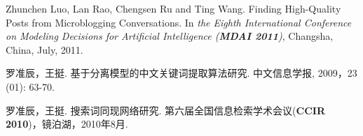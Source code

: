 \begin{resume}
\begin{enumerate}[{[}1{]}]
\item Zhunchen Luo, Lan Rao, Chengsen Ru and Ting Wang. Finding High-Quality Posts from Microblogging Conversations. In {\it the Eighth International Conference on Modeling Decisions for Artificial Intelligence (\textbf{MDAI 2011})}, Changsha, China, July, 2011.

\item 罗准辰，王挺. 基于分离模型的中文关键词提取算法研究. 中文信息学报, 2009，23 (01): 63-70.

\item 罗准辰，王挺. 搜索词同现网络研究. 第六届全国信息检索学术会议(\textbf{CCIR 2010})，镜泊湖，2010年8月.

  \end{enumerate}

\end{resume}
